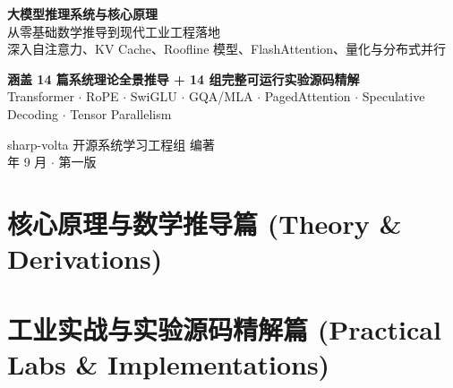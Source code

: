 \documentclass[11pt,a4paper,openany,UTF8]{ctexbook}
\begin{document}
\begin{titlepage}
\centering
\vspace*{2.5cm}
{\Huge\bfseries\sffamily\color{primary} 大模型推理系统与核心原理}\\[0.6cm]
{\LARGE\sffamily\color{secondary} 从零基础数学推导到现代工业工程落地}\\[1.2cm]
{\large\sffamily\color{darktext} 深入自注意力、KV Cache、Roofline 模型、FlashAttention、量化与分布式并行}\\[2.5cm]

\begin{tcolorbox}[enhanced, width=0.88\textwidth, colback=primary!5!white, colframe=primary, arc=3mm, boxrule=1pt, center]
\centering\sffamily\small
\textbf{涵盖 14 篇系统理论全景推导 + 14 组完整可运行实验源码精解}\\[0.3cm]
Transformer $\cdot$ RoPE $\cdot$ SwiGLU $\cdot$ GQA/MLA $\cdot$ PagedAttention $\cdot$ Speculative Decoding $\cdot$ Tensor Parallelism
\end{tcolorbox}

\vfill
{\large\sffamily sharp-volta 开源系统学习工程组 编著}\\[0.3cm]
{\small{} 年 9 月 $\cdot$ 第一版}
\vspace*{1.5cm}
\end{titlepage}

\frontmatter
\pagestyle{plain}

\tableofcontents
\cleardoublepage

\mainmatter
\pagestyle{fancy}

\part{核心原理与数学推导篇 (Theory \& Derivations)}















\part{工业实战与实验源码精解篇 (Practical Labs \& Implementations)}














\end{document}
